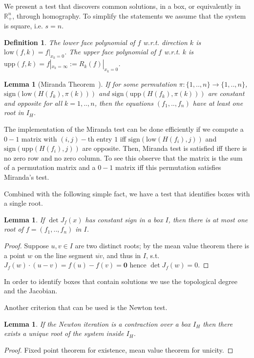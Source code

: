 \documentclass{sig-alternate}
\newtheorem{lemma}[theorem]{Lemma}
\newtheorem{definition}[theorem]{Definition}\newtheorem{dxample}[theorem]{Example}
\def\bm{\boldsymbol}
\newcommand{\dott}{{..}}
\def\RR{\mathbb{R}}
\def\sign{\mathrm{sign}}
\def\flower{\mathrm{low}}
\def\fupper{\mathrm{upp}}
\begin{document}
We present a test that discovers common solutions, in a box, or
equivalently in $\RR_{+}^n$, through homography. To simplify the
statements we assume that the system is square, i.e. $s=n$.

\begin{definition}
  The \emph{lower face} polynomial of $f$ w.r.t. direction $k$ is
  $\flower(f,k)=f|_{x_k=0}$. The \emph{upper face} polynomial of $f$
  w.r.t. $k$ is $\fupper(f,k)=f|_{x_k=\infty} := R_k(f)|_{x_k=0}$.
\end{definition}



\begin{lemma}[Miranda Theorem~\cite{vrahatis1989}]
  If for some permutation $\pi : \{1,\dott,n\}\to\{1,\dott,n\}$,
  $\sign( \flower( H(f_k),\pi(k) ) )$ and $\sign( \fupper( H(f_k),
  \pi(k) ) )$ are constant and opposite for all $k=1,\dott,n$, then
  the equations $(f_1,\dott,f_n)$ have at least one root in $I_H$.
\end{lemma}

The implementation of the Miranda test can be done efficiently if we
compute a $0-1$ matrix with $(i,j)-$th entry $1$ iff $\sign( \flower(
H(f_i),j))$ and $\sign(\fupper(H(f_i), j))$ are opposite. Then,
Miranda test is satisfied iff there is no zero row and no zero
column. To see this observe that the matrix is the sum of a
permutation matrix and a $0-1$ matrix iff this permutation satisfies
Miranda's test.

Combined with the following simple fact, we have a test that
identifies boxes with a single root.
\begin{lemma} 
  If $\det J_f(x)$ has constant sign in a box $I$, then there
  is at most one root of $f=(f_1,\dott,f_n)$ in $I$.
\end{lemma} 
\begin{proof}
  Suppose $u,v\in I$ are two distinct roots; by the mean value theorem
  there is a point $w$ on the line segment $\overline{uv}$, and thus
  in $I$, s.t. $J_f(w)\cdot (u-v)=f(u)-f(v)=\bm 0$ hence $\det
  J_f(w)=0$.
\end{proof}


In order to identify boxes that contain solutions we use the topological degree and the Jacobian.

Another criterion that can be used is the Newton test.
\begin{lemma}
If the Newton iteration is a contraction over a box $I_H$ then there exists a unique root of the system inside $I_H$.
\end{lemma}
\begin {proof}
Fixed point theorem for existence, mean value theorem for unicity.
\end{proof}
\end{document}
